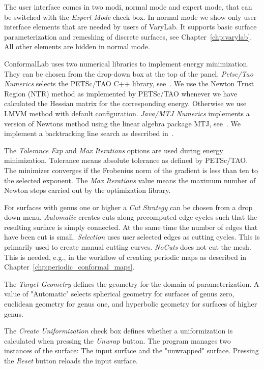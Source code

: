 \documentclass[Thesis.tex]{subfiles}
\begin{document}
The user interface comes in two modi, normal mode and expert mode, that can be switched with the \emph{Expert Mode} check box. 
In normal mode we show only user interface elements that are needed by users of {\sc VaryLab}.
It supports basic surface parameterization and remeshing of discrete surfaces, see Chapter~\ref{chp:varylab}. 
All other elements are hidden in normal mode.

{\sc ConformalLab} uses two numerical libraries to implement energy minimization. 
They can be chosen from the drop-down box at the top of the panel. 
\emph{Petsc/Tao Numerics} selects the {\sc PETSc/TAO} C++ library, see~\cite{petsc-web-page, tao-user-ref}. 
We use the Newton Trust Region (NTR) method as implemented by {\sc PETSc/TAO} whenever we have calculated the Hessian matrix for the corresponding energy. 
Otherwise we use LMVM method with default configuration. 
\emph{Java/MTJ Numerics} implements a version of Newtons method using the linear algebra package MTJ, see~\cite{mtj-website}. 
We implement a backtracking line search as described in~\cite[pp.~464]{boyd2004convex}.

The \emph{Tolerance Exp} and \emph{Max Iterations} options are used during energy minimization. 
Tolerance means absolute tolerance as defined by {\sc PETSc/TAO}. 
The minimizer converges if the Frobenius norm of the gradient is less than ten to the selected exponent. The \emph{Max Iterations} value means the maximum number of Newton steps carried out by the optimization library.

For surfaces with genus one or higher a \emph{Cut Strategy} can be chosen from a drop down menu. 
\emph{Automatic} creates cuts along precomputed edge cycles such that the resulting surface is simply connected. 
At the same time the number of edges that have been cut is small. 
\emph{Selection} uses user selected edges as cutting cycles. 
This is primarily used to create manual cutting curves. 
\emph{NoCuts} does not cut the mesh. 
This is needed, e.g., in the workflow of creating periodic maps as described in Chapter~\ref{chp:periodic_conformal_maps}.

The \emph{Target Geometry} defines the geometry for the domain of parameterization. 
A value of "Automatic" selects spherical geometry for surfaces of genus zero, euclidean geometry for genus one, and hyperbolic geometry for surfaces of higher genus.

The \emph{Create Uniformization} check box defines whether a uniformization is calculated when pressing the \emph{Unwrap} button. 
The program manages two instances of the surface: The input surface and the "unwrapped" surface. Pressing the \emph{Reset} button reloads the input surface.
\end{document}

